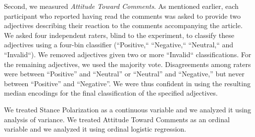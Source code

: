 Second, we measured {\it Attitude Toward Comments}.  As mentioned earlier, each participant who reported having read the comments was asked to provide two adjectives describing their reaction to the comments accompanying the article.
We asked four independent raters, blind to the experiment, to classify these adjectives using a four-bin classifier (``Positive,`` ``Negative,`` ``Neutral,`` and ``Invalid``). %
We removed adjectives given two or more ``Invalid`` classifications.%
For the remaining adjectives, we used the majority vote.  Disagreements among raters were between ``Positive'' and ``Neutral'' or ``Neutral'' and ``Negative,'' but never between ``Positive'' and ``Negative''.  
We were thus confident in using the resulting median encodings for the final classification of the specified adjectives. 

We treated Stance Polarization as a continuous variable and we analyzed it using analysis of variance.
We treated Attitude Toward Comments as an ordinal variable and we analyzed it using ordinal logistic regression.


